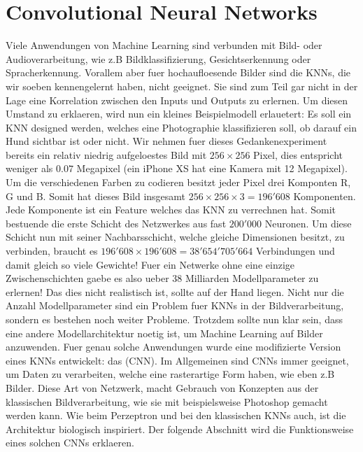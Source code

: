 \chapter{Convolutional Neural Networks}
Viele Anwendungen von Machine Learning sind verbunden mit Bild- oder
Audioverarbeitung, wie z.B Bildklassifizierung, Gesichtserkennung oder
Spracherkennung.
Vorallem aber fuer hochaufloesende Bilder sind die KNNs, die wir soeben
kennengelernt haben, nicht geeignet. Sie sind zum Teil gar nicht in der
Lage eine Korrelation zwischen den Inputs und Outputs zu erlernen.
Um diesen Umstand zu erklaeren, wird nun ein kleines Beispielmodell erlauetert:
\para{}
Es soll ein KNN designed werden, welches eine Photographie klassifizieren
soll, ob darauf ein Hund sichtbar ist oder nicht. Wir nehmen fuer dieses
Gedankenexperiment bereits ein relativ niedrig aufgeloestes Bild mit $256 \times 256$
Pixel, dies entspricht weniger als $0.07$ Megapixel (ein iPhone XS hat eine Kamera mit
12 Megapixel). Um die verschiedenen Farben zu codieren besitzt jeder Pixel drei Komponten R, G
und B. Somit hat dieses Bild insgesamt $256 \times 256 \times 3 = 196'608$
Komponenten. Jede Komponente ist ein Feature welches das KNN zu verrechnen hat. Somit bestuende
die erste Schicht des Netzwerkes aus fast $200'000$ Neuronen. Um diese Schicht
nun mit seiner Nachbarsschicht, welche gleiche Dimensionen besitzt, zu verbinden, braucht
es $196'608 \times 196'608 = 38'654'705'664$ Verbindungen und damit gleich so
viele Gewichte! Fuer ein Netwerke ohne eine einzige Zwischenschichten gaebe es
also ueber 38 Milliarden Modellparameter zu erlernen! Das dies nicht realistisch ist,
sollte auf der Hand liegen.
\para{}
Nicht nur die Anzahl Modellparameter sind ein Problem fuer KNNs in der
Bildverarbeitung, sondern es bestehen noch weiter Probleme.
Trotzdem sollte nun klar sein, dass eine andere Modellarchitektur noetig ist, um Machine
Learning auf Bilder anzuwenden. Fuer genau solche Anwendungen wurde eine modifizierte
Version eines KNNs entwickelt: das  (CNN).
Im Allgemeinen sind CNNs immer geeignet, um Daten zu verarbeiten, welche eine
rasterartige Form haben, wie eben z.B Bilder.
Diese Art von Netzwerk, macht Gebrauch von Konzepten aus der klassischen
Bildverarbeitung, wie sie mit beispielsweise Photoshop gemacht werden kann.
Wie beim Perzeptron und bei den klassischen KNNs auch, ist die Architektur
biologisch inspiriert.
Der folgende Abschnitt wird die Funktionsweise eines solchen CNNs erklaeren.
\para{}
\cite{Goodfellow-et-al-2016}
\cite{deeplearning.ai:cnn}
\cite{wiki:cnn}

